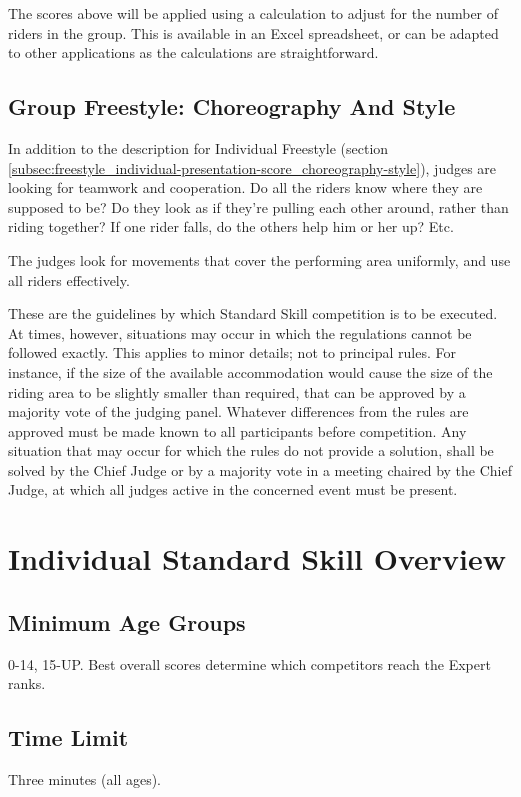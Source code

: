 The scores above will be applied using a calculation to adjust for the number of riders in the group.
This is available in an Excel spreadsheet, or can be adapted to other applications as the calculations are straightforward.

\subsection{Group Freestyle: Choreography And Style}
In addition to the description for Individual Freestyle (section \ref{subsec:freestyle_individual-presentation-score_choreography-style}), judges are looking for teamwork and cooperation.
Do all the riders know where they are supposed to be? Do they look as if they're pulling each other around, rather than riding together? If one rider falls, do the others help him or her up? Etc.

The judges look for movements that cover the performing area uniformly, and use all riders effectively.

\newpage

These are the guidelines by which Standard Skill competition is to be executed.
At times, however, situations may occur in which the regulations cannot be followed exactly.
This applies to minor details; not to principal rules.
For instance, if the size of the available accommodation would cause the size of the riding area to be slightly smaller than required, that can be approved by a majority vote of the judging panel.
Whatever differences from the rules are approved must be made known to all participants before competition.
Any situation that may occur for which the rules do not provide a solution, shall be solved by the Chief Judge or by a majority vote in a meeting chaired by the Chief Judge, at which all judges active in the concerned event must be present.

\section{Individual Standard Skill Overview}

\subsection{Minimum Age Groups}
0-14, 15-UP.
Best overall scores determine which competitors reach the Expert ranks.

\subsection{Time Limit}
Three minutes (all ages).

